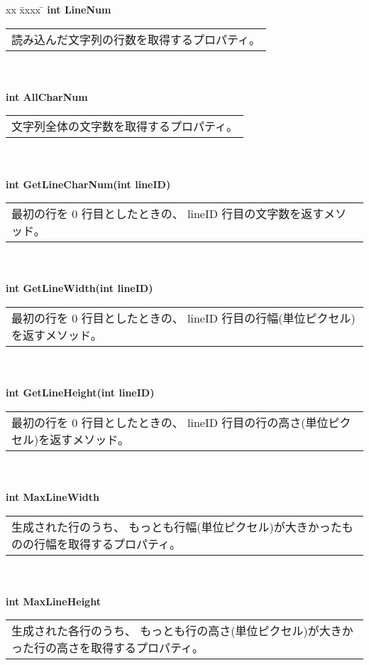\begin{tabbing}
xx \= xxxx \= \kill
\> \textbf{int LineNum} \\
	\> \> \begin{tabular}{p{15cm}}
		読み込んだ文字列の行数を取得するプロパティ。
	\end{tabular} \\ \\
\> \textbf{int AllCharNum} \\
	\> \> \begin{tabular}{p{15cm}}
		文字列全体の文字数を取得するプロパティ。
	\end{tabular} \\ \\
\> \textbf{int GetLineCharNum(int lineID)} \\
	\> \> \begin{tabular}{p{15cm}}
		最初の行を 0 行目としたときの、
		lineID 行目の文字数を返すメソッド。
	\end{tabular} \\ \\
\> \textbf{int GetLineWidth(int lineID)} \\
	\> \> \begin{tabular}{p{15cm}}
		最初の行を 0 行目としたときの、
		lineID 行目の行幅(単位ピクセル)を返すメソッド。
	\end{tabular} \\ \\
\> \textbf{int GetLineHeight(int lineID)} \\
	\> \> \begin{tabular}{p{15cm}}
		最初の行を 0 行目としたときの、
		lineID 行目の行の高さ(単位ピクセル)を返すメソッド。
	\end{tabular} \\ \\
\> \textbf{int MaxLineWidth} \\
	\> \> \begin{tabular}{p{15cm}}
		生成された行のうち、
		もっとも行幅(単位ピクセル)が大きかったものの行幅を取得するプロパティ。
	\end{tabular} \\ \\
\> \textbf{int MaxLineHeight} \\
	\> \> \begin{tabular}{p{15cm}}
		生成された各行のうち、
		もっとも行の高さ(単位ピクセル)が大きかった行の高さを取得するプロパティ。
	\end{tabular} \\ \\

\end{tabbing}
